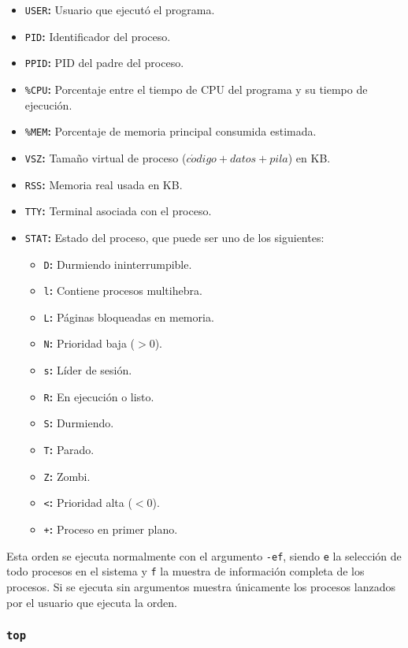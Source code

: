 \begin{itemize}
	\item\texttt{USER}\textbf{:} Usuario que ejecutó el programa.
	\item\texttt{PID}\textbf{:} Identificador del proceso.
	\item\texttt{PPID}\textbf{:} PID del padre del proceso.
	\item\texttt{\%CPU}\textbf{:} Porcentaje entre el tiempo de CPU del programa y su tiempo de ejecución.
	\item\texttt{\%MEM}\textbf{:} Porcentaje de memoria principal consumida estimada.
	\item\texttt{VSZ}\textbf{:} Tamaño virtual de proceso ($c\acute{o}digo+datos+pila$) en KB\@.
	\item\texttt{RSS}\textbf{:} Memoria real usada en KB\@.
	\item\texttt{TTY}\textbf{:} Terminal asociada con el proceso.
	\item\texttt{STAT}\textbf{:} Estado del proceso, que puede ser uno de los siguientes:
	\begin{itemize}
		\item\texttt{D}\textbf{:} Durmiendo ininterrumpible.
		\item\texttt{l}\textbf{:} Contiene procesos multihebra.
		\item\texttt{L}\textbf{:} Páginas bloqueadas en memoria.
		\item\texttt{N}\textbf{:} Prioridad baja ($>0$).
		\item\texttt{s}\textbf{:} Líder de sesión.
		\item\texttt{R}\textbf{:} En ejecución o listo.
		\item\texttt{S}\textbf{:} Durmiendo.
		\item\texttt{T}\textbf{:} Parado.
		\item\texttt{Z}\textbf{:} Zombi.
		\item\texttt{<}\textbf{:} Prioridad alta ($<0$).
		\item\texttt{+}\textbf{:} Proceso en primer plano.
	\end{itemize}
\end{itemize}

Esta orden se ejecuta normalmente con el argumento \texttt{-ef}, siendo \texttt{e} la selección de todo procesos en el sistema y \texttt{f} la muestra de información completa de los procesos.
Si se ejecuta sin argumentos muestra únicamente los procesos lanzados por el usuario que ejecuta la orden.

\subsubsection{\texttt{top}}

